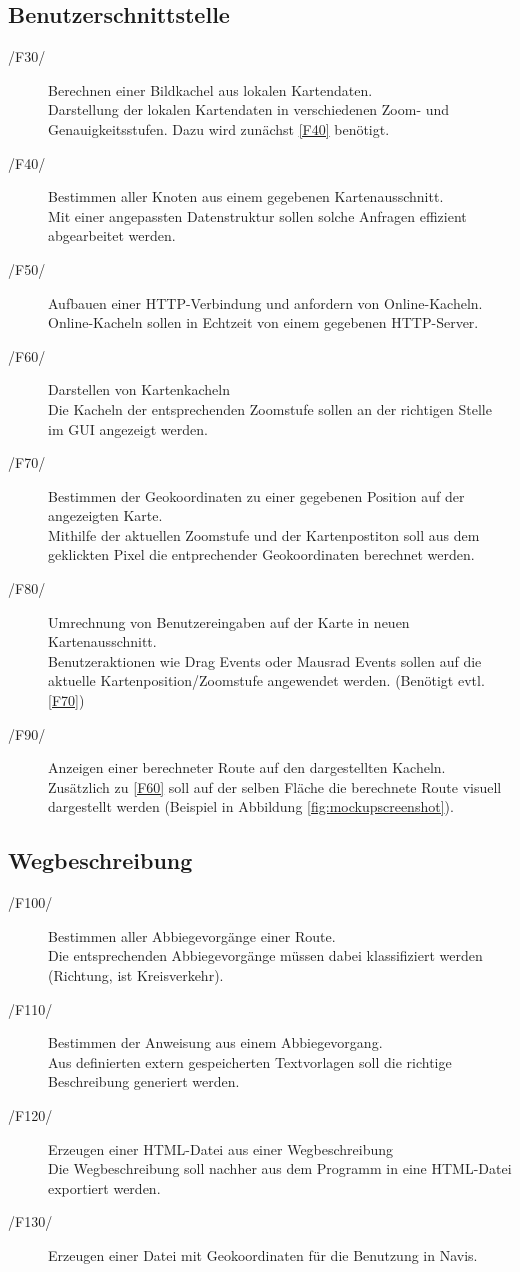 \documentclass[a4paper, 11pt]{article}
\newcommand{\oitem}[1]{\item[/#1/\label{#1}]}
\begin{document}
\subsection{Benutzerschnittstelle}
\begin{description}
\oitem{F30}
Berechnen einer Bildkachel aus lokalen Kartendaten.\\
Darstellung der lokalen Kartendaten in verschiedenen Zoom- und Genauigkeitsstufen. Dazu wird zunächst \ref{F40} benötigt.
\oitem{F40}
Bestimmen aller Knoten aus einem gegebenen Kartenausschnitt.\\
Mit einer angepassten Datenstruktur sollen solche Anfragen effizient abgearbeitet werden.
\oitem{F50}
Aufbauen einer HTTP-Verbindung und anfordern von Online-Kacheln.\\
Online-Kacheln sollen in Echtzeit von einem gegebenen HTTP-Server.
\oitem{F60}
Darstellen von Kartenkacheln\\
Die Kacheln der entsprechenden Zoomstufe sollen an der richtigen Stelle im GUI angezeigt werden.
\oitem{F70}
Bestimmen der Geokoordinaten zu einer gegebenen Position auf der angezeigten Karte.\\
Mithilfe der aktuellen Zoomstufe und der Kartenpostiton soll aus dem geklickten Pixel die entprechender Geokoordinaten berechnet werden.
\oitem{F80}
Umrechnung von Benutzereingaben auf der Karte in neuen Kartenausschnitt.\\
Benutzeraktionen wie Drag Events oder Mausrad Events sollen auf die aktuelle Kartenposition/Zoomstufe angewendet werden. (Benötigt evtl. \ref{F70})
\oitem{F90}
Anzeigen einer berechneter Route auf den dargestellten Kacheln.\\
Zusätzlich zu \ref{F60} soll auf der selben Fläche die berechnete Route visuell dargestellt werden (Beispiel in  Abbildung \ref{fig:mockupscreenshot}).
\end{description}
\subsection{Wegbeschreibung}
\begin{description}
\oitem{F100}
Bestimmen aller Abbiegevorgänge einer Route.\\
Die entsprechenden Abbiegevorgänge müssen dabei klassifiziert werden (Richtung, ist Kreisverkehr).
\oitem{F110}
Bestimmen der Anweisung aus einem Abbiegevorgang.\\
Aus definierten extern gespeicherten Textvorlagen soll die richtige Beschreibung generiert werden.
\oitem{F120}
Erzeugen einer HTML-Datei aus einer Wegbeschreibung\\
Die Wegbeschreibung soll nachher aus dem Programm in eine HTML-Datei exportiert werden.
\oitem{F130}
Erzeugen einer Datei mit Geokoordinaten für die Benutzung in Navis.
\end{description}
\end{document}
